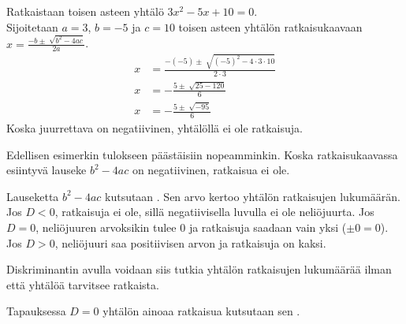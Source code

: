 
\begin{esimerkki}
    Ratkaistaan toisen asteen yhtälö $3x^2-5x+10=0$.\\
    
    Sijoitetaan $a=3$, $b=-5$ ja $c=10$ toisen asteen yhtälön ratkaisukaavaan $x=\frac{-b \pm \sqrt[]{b^2-4ac}}{2a}$.
    \begin{align*}
        x &=\frac{-(-5) \pm \sqrt[]{(-5)^2-4\cdot 3 \cdot 10}}{2 \cdot 3} \\
        x &=-\frac{5 \pm \sqrt[]{25-120}}{6} \\
          x &=-\frac{5 \pm \sqrt[]{-95}}{6} 
    \end{align*}
    Koska juurrettava on negatiivinen, yhtälöllä ei ole ratkaisuja.
\end{esimerkki}

Edellisen esimerkin tulokseen päästäisiin nopeamminkin. Koska ratkaisukaavassa esiintyvä lauseke $b^2-4ac$ on negatiivinen, ratkaisua ei ole.

Lauseketta $b^2-4ac$ kutsutaan . Sen arvo kertoo yhtälön ratkaisujen lukumäärän. Jos $D<0$, ratkaisuja ei ole, sillä negatiivisella luvulla ei ole neliöjuurta. Jos $D=0$, neliöjuuren arvoksikin tulee $0$ ja ratkaisuja saadaan vain yksi ($\pm 0 = 0$). Jos $D>0$, neliöjuuri saa positiivisen arvon ja ratkaisuja on kaksi.

Diskriminantin avulla voidaan siis tutkia yhtälön ratkaisujen lukumäärää ilman että yhtälöä tarvitsee ratkaista.

\newpage
{}
Tapauksessa $D=0$ yhtälön ainoaa ratkaisua kutsutaan sen .

